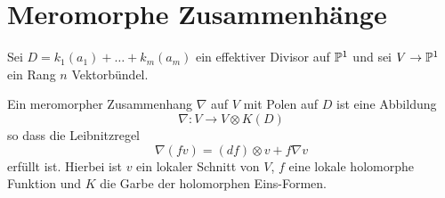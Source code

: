 \chapter{Meromorphe Zusammenhänge}
\begin{comment}
Siehe:
\begin{itemize}
  \item \cite{sabbah2007isomonodromic}
\end{itemize}
\end{comment}
%
Sei $D=k_1(a_1)+\dots+k_m(a_m)$ ein effektiver Divisor auf $\P^1$ und sei
$V\to\P^1$ ein Rang $n$ Vektorbündel.
\begin{defn}
Ein meromorpher Zusammenhang $\nabla$ auf $V$ mit Polen auf $D$ ist eine
Abbildung
\[
  \nabla: V\to V\otimes K(D)
\]
so dass die Leibnitzregel
\begin{equation}
  \nabla(fv)=(df)\otimes v + f\nabla v
\end{equation}
erfüllt ist. Hierbei ist $v$ ein lokaler Schnitt von $V$, $f$ eine lokale
holomorphe Funktion und $K$ die Garbe der holomorphen Eins-Formen.
\end{defn}
%
\begin{comment}
\begin{prop}
Die Differenz zweier meromorphen Zusammenhänge ist $???$-linear.
\end{prop}
\begin{proof}
Denn für zwei meromorphe Zusammenhänge $\nabla_1$ und $\nabla_2$ gilt:
\begin{align*}
(\nabla_1 - \nabla_2)(fv) &= \nabla_1(fv) - \nabla_2(fv)
\\&=(df)\otimes v + f\nabla_1 v -(df)\otimes v - f\nabla_2 v
\\&=f\nabla_1 v - f\nabla_2 v
\\&=f(\nabla_1 - \nabla_2) v
\end{align*}
und da ??? gilt reicht dies um die Aussage zu zeigen
\end{proof}
\end{comment}
%
\begin{prop}[Proposition 2.1]
\end{prop}


